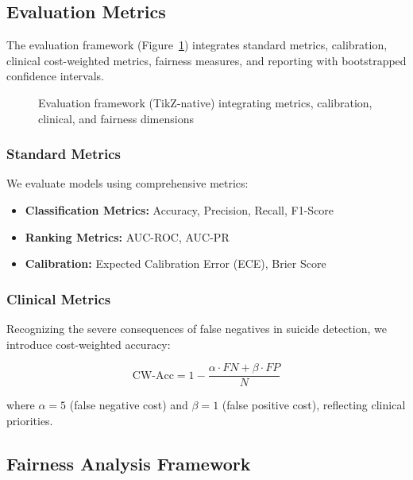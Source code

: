 \documentclass[conference]{IEEEtran}
\begin{document}
\subsection{Evaluation Metrics}

The evaluation framework (Figure~\ref{fig:evaluation_framework}) integrates standard metrics, calibration, clinical cost-weighted metrics, fairness measures, and reporting with bootstrapped confidence intervals.

\begin{figure}[H]
    \centering
    \resizebox{\linewidth}{!}{\EvaluationFrameworkDiagram}
    \caption{Evaluation framework (TikZ-native) integrating metrics, calibration, clinical, and fairness dimensions}
    \label{fig:evaluation_framework}
\end{figure}

\subsubsection{Standard Metrics}

We evaluate models using comprehensive metrics:
\begin{itemize}
    \item \textbf{Classification Metrics:} Accuracy, Precision, Recall, F1-Score
    \item \textbf{Ranking Metrics:} AUC-ROC, AUC-PR
    \item \textbf{Calibration:} Expected Calibration Error (ECE), Brier Score
\end{itemize}

\subsubsection{Clinical Metrics}

Recognizing the severe consequences of false negatives in suicide detection, we introduce cost-weighted accuracy:

\begin{equation}
    \text{CW-Acc} = 1 - \frac{\alpha \cdot FN + \beta \cdot FP}{N}
\end{equation}

where $\alpha = 5$ (false negative cost) and $\beta = 1$ (false positive cost), reflecting clinical priorities.

\subsection{Fairness Analysis Framework}
\end{document}
